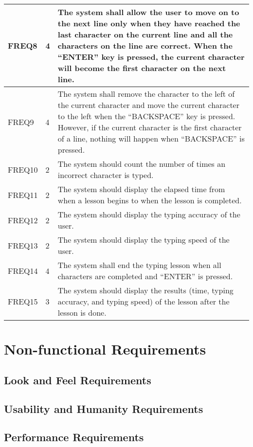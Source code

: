 \documentclass[12pt, titlepage]{article}
\begin{document}
\begin{center}
\begin{longtable}{ |m{2cm}|m{1.8cm}|m{9.4cm}| }
    \hline
    FREQ8 & 4 & The system shall allow the user to move on to the next line only when they have reached the last character on the current line and all the characters on the line are correct. When the “ENTER” key is pressed, the current character will become the first character on the next line. \\ 
    \hline
    FREQ9 & 4 & The system shall remove the character to the left of the current character and move the current character to the left when the “BACKSPACE” key is pressed. However, if the current character is the first character of a line, nothing will happen when “BACKSPACE” is pressed. \\ 
    \hline
    FREQ10 & 2 & The system should count the number of times an incorrect character is typed. \\ 
    \hline
    FREQ11 & 2 & The system should display the elapsed time from when a lesson begins to when the lesson is completed. \\ 
    \hline
    FREQ12 & 2 & The system should display the typing accuracy of the user. \\ 
    \hline
    FREQ13 & 2 & The system should display the typing speed of the user. \\ 
    \hline
    FREQ14 & 4 & The system shall end the typing lesson when all characters are completed and “ENTER” is pressed. \\ 
    \hline
    FREQ15 & 3 & The system should display the results (time, typing accuracy, and typing speed) of the lesson after the lesson is done. \\ 
    \hline
\end{longtable}
\end{center}



\section{Non-functional Requirements}

\subsection{Look and Feel Requirements}

\subsection{Usability and Humanity Requirements}

\subsection{Performance Requirements}
\end{document}
